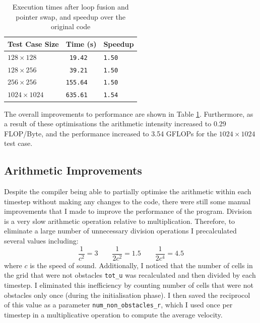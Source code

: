 \documentclass[11pt, twocolumn, a4paper]{article}
\begin{document}
\begin{table}[htbp]
  \begin{center}
  \caption{Execution times after loop fusion and pointer swap, and speedup over the original code}\label{tab:loop_fusion_pointer_swap}
  \begin{tabular}{l | l l} 
      \hline\hline
      Test Case Size&Time (s)&Speedup\\
      \hline
      $128 \times 128$&\texttt{ 19.42}&\texttt{1.50}\\
      $128 \times 256$&\texttt{ 39.21}&\texttt{1.50}\\
      $256 \times 256$&\texttt{155.64}&\texttt{1.50}\\
      $1024 \times 1024$&\texttt{635.61}&\texttt{1.54}\\
      \hline
    \end{tabular}
  \end{center}
\end{table}

The overall improvements to performance are shown in Table \ref{tab:loop_fusion_pointer_swap}.
Furthermore, as a result of these optimisations the arithmetic intensity increased to 0.29 FLOP/Byte, and the performance increased to 3.54 GFLOPs for the $1024 \times 1024$ test case.

\subsection{Arithmetic Improvements}

Despite the compiler being able to partially optimise the arithmetic within each timestep without making any changes to the code, there were still some manual improvements that I made to improve the performance of the program.
Division is a very slow arithmetic operation relative to multiplication.
Therefore, to eliminate a large number of unnecessary division operations I precalculated several values including:
\[
    \frac{1}{c^2} = 3\qquad
    \frac{1}{2c^2} = 1.5\qquad
    \frac{1}{2c^4} = 4.5
\]
where $c$ is the speed of sound.
Additionally, I noticed that the number of cells in the grid that were not obstacles \texttt{tot\_u} was recalculated and then divided by each timestep.
I eliminated this inefficiency by counting number of cells that were not obstacles only once (during the initialisation phase).
I then saved the reciprocol of this value as a parameter \texttt{num\_non\_obstacles\_r}, which I used once per timestep in a multiplicative operation to compute the average velocity.
\end{document}
